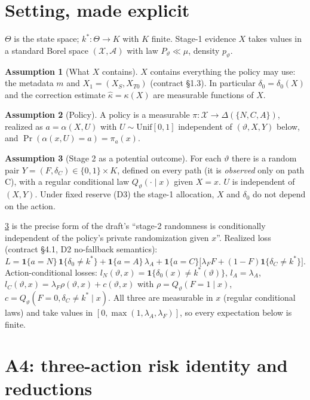 \documentclass[11pt,a4paper]{article}
\theoremstyle{definition}
\newtheorem{assumption}{Assumption}
\theoremstyle{remark}
\newcommand{\vt}{\vartheta}
\newcommand{\lA}{\lambda_A}
\newcommand{\lF}{\lambda_F}
\begin{document}
\section{Setting, made explicit}

$\Theta$ is the state space; $k^*:\Theta\to K$ with $K$ finite. Stage-1 evidence $X$ takes
values in a standard Borel space $(\mathcal X,\mathcal A)$ with law $P_\vt\ll\mu$, density
$p_\vt$.

\begin{assumption}[What $X$ contains]\label{S:X}
$X$ contains everything the policy may use: the metadata $m$ and
$X_1=(X_S,X_{T0})$ (contract §1.3). In particular $\delta_0=\delta_0(X)$ and the
correction estimate $\hat\kappa=\kappa(X)$ are measurable functions of $X$.
\end{assumption}

\begin{assumption}[Policy]\label{S:pol}
A policy is a measurable $\pi:\mathcal X\to\Delta(\{N,C,A\})$, realized as
$a=\alpha(X,U)$ with $U\sim\mathrm{Unif}[0,1]$ independent of $(\vt,X,Y)$ below, and
$\Pr(\alpha(x,U)=a)=\pi_a(x)$.
\end{assumption}

\begin{assumption}[Stage 2 as a potential outcome]\label{S:st2}
For each $\vt$ there is a random pair $Y=(F,\delta_C)\in\{0,1\}\times K$, defined on every
path (it is \emph{observed} only on path C), with a regular conditional law
$Q_\vt(\cdot\mid x)$ given $X=x$. $U$ is independent of $(X,Y)$. Under fixed reserve
(D3) the stage-1 allocation, $X$ and $\delta_0$ do not depend on the action.
\end{assumption}

\ref{S:st2} is the precise form of the draft's ``stage-2 randomness is conditionally
independent of the policy's private randomization given $x$''. Realized loss
(contract §4.1, D2 no-fallback semantics):
\[
L=\mathbf 1\{a=N\}\,\mathbf 1\{\delta_0\neq k^*\}+\mathbf 1\{a=A\}\,\lA
+\mathbf 1\{a=C\}\bigl[\lF F+(1-F)\mathbf 1\{\delta_C\neq k^*\}\bigr].
\]
Action-conditional losses: $l_N(\vt,x)=\mathbf 1\{\delta_0(x)\neq k^*(\vt)\}$,
$l_A=\lA$, $l_C(\vt,x)=\lF\rho(\vt,x)+c(\vt,x)$ with
$\rho=Q_\vt(F=1\mid x)$, $c=Q_\vt(F=0,\delta_C\neq k^*\mid x)$. All three are measurable
in $x$ (regular conditional laws) and take values in $[0,\max(1,\lA,\lF)]$, so every
expectation below is finite.

\section{A4: three-action risk identity and reductions}
\end{document}
